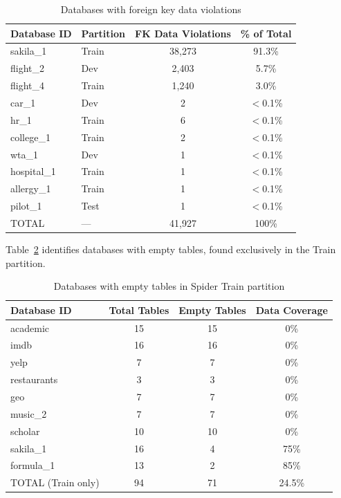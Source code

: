 \documentclass[]{einformatica}
\begin{document}
\begin{table}[ht]
    \caption{Databases with foreign key data violations}
    \label{tab:schema_fk_data_violations}
    \centering
    \footnotesize
    \begin{tabular}{llcc}
        \toprule
        \textbf{Database ID} & \textbf{Partition} & \textbf{FK Data Violations} & \textbf{\% of Total} \\
        \midrule
        sakila\_1 & Train & 38,273 & 91.3\% \\
        flight\_2 & Dev & 2,403 & 5.7\% \\
        flight\_4 & Train & 1,240 & 3.0\% \\
        car\_1 & Dev & 2 & $<$0.1\% \\
        hr\_1 & Train & 6 & $<$0.1\% \\
        college\_1 & Train & 2 & $<$0.1\% \\
        wta\_1 & Dev & 1 & $<$0.1\% \\
        hospital\_1 & Train & 1 & $<$0.1\% \\
        allergy\_1 & Train & 1 & $<$0.1\% \\
        pilot\_1 & Test & 1 & $<$0.1\% \\
        \midrule
        TOTAL & --- & 41,927 & 100\% \\
        \bottomrule
    \end{tabular}
\end{table}

Table~\ref{tab:schema_empty_tables} identifies databases with empty tables, found exclusively in the Train partition.

\begin{table}[ht]
    \caption{Databases with empty tables in Spider Train partition}
    \label{tab:schema_empty_tables}
    \centering
    \footnotesize
    \begin{tabular}{lccc}
        \toprule
        \textbf{Database ID} & \textbf{Total Tables} & \textbf{Empty Tables} & \textbf{Data Coverage} \\
        \midrule
        academic & 15 & 15 & 0\% \\
        imdb & 16 & 16 & 0\% \\
        yelp & 7 & 7 & 0\% \\
        restaurants & 3 & 3 & 0\% \\
        geo & 7 & 7 & 0\% \\
        music\_2 & 7 & 7 & 0\% \\
        scholar & 10 & 10 & 0\% \\
        sakila\_1 & 16 & 4 & 75\% \\
        formula\_1 & 13 & 2 & 85\% \\
        \midrule
        TOTAL (Train only) & 94 & 71 & 24.5\% \\
        \bottomrule
    \end{tabular}
\end{table}
\end{document}
